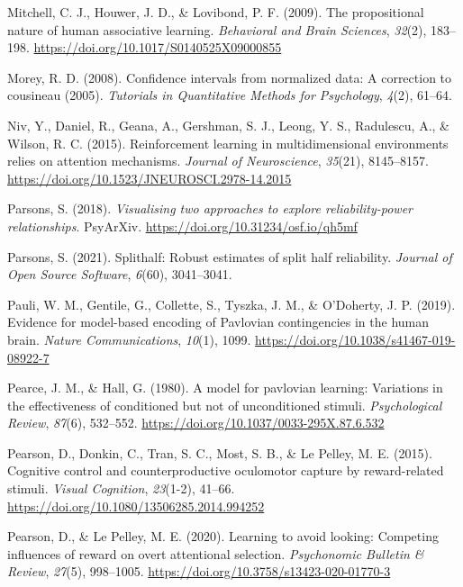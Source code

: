 \documentclass[
  man,
  floatsintext,
  longtable,
  nolmodern,
  notxfonts,
  notimes,
  mask,
  colorlinks=true,linkcolor=blue,citecolor=blue,urlcolor=blue]{apa7}
\newlength{\cslhangindent}
\newenvironment{CSLReferences}[2] %
 {\begin{list}{}{%
  \setlength{\itemindent}{0pt}
  \setlength{\leftmargin}{0pt}
  \setlength{\parsep}{0pt}
  \ifodd #1
   \setlength{\leftmargin}{\cslhangindent}
   \setlength{\itemindent}{-1\cslhangindent}
  \fi
  \setlength{\itemsep}{#2\baselineskip}}}
 {\end{list}}
\begin{document}
\begin{CSLReferences}{1}{0}
Mitchell, C. J., Houwer, J. D., \& Lovibond, P. F. (2009). The
propositional nature of human associative learning. \emph{Behavioral and
Brain Sciences}, \emph{32}(2), 183--198.
\url{https://doi.org/10.1017/S0140525X09000855}

Morey, R. D. (2008). Confidence intervals from normalized data: A
correction to cousineau (2005). \emph{Tutorials in Quantitative Methods
for Psychology}, \emph{4}(2), 61--64.

Niv, Y., Daniel, R., Geana, A., Gershman, S. J., Leong, Y. S.,
Radulescu, A., \& Wilson, R. C. (2015). Reinforcement learning in
multidimensional environments relies on attention mechanisms.
\emph{Journal of Neuroscience}, \emph{35}(21), 8145--8157.
\url{https://doi.org/10.1523/JNEUROSCI.2978-14.2015}

Parsons, S. (2018). \emph{Visualising two approaches to explore
reliability-power relationships}. PsyArXiv.
\url{https://doi.org/10.31234/osf.io/qh5mf}

Parsons, S. (2021). Splithalf: Robust estimates of split half
reliability. \emph{Journal of Open Source Software}, \emph{6}(60),
3041--3041.

Pauli, W. M., Gentile, G., Collette, S., Tyszka, J. M., \& O'Doherty, J.
P. (2019). Evidence for model-based encoding of Pavlovian contingencies
in the human brain. \emph{Nature Communications}, \emph{10}(1), 1099.
\url{https://doi.org/10.1038/s41467-019-08922-7}

Pearce, J. M., \& Hall, G. (1980). A model for pavlovian learning:
Variations in the effectiveness of conditioned but not of unconditioned
stimuli. \emph{Psychological Review}, \emph{87}(6), 532--552.
\url{https://doi.org/10.1037/0033-295X.87.6.532}

Pearson, D., Donkin, C., Tran, S. C., Most, S. B., \& Le Pelley, M. E.
(2015). Cognitive control and counterproductive oculomotor capture by
reward-related stimuli. \emph{Visual Cognition}, \emph{23}(1-2), 41--66.
\url{https://doi.org/10.1080/13506285.2014.994252}

Pearson, D., \& Le Pelley, M. E. (2020). Learning to avoid looking:
{Competing} influences of reward on overt attentional selection.
\emph{Psychonomic Bulletin \& Review}, \emph{27}(5), 998--1005.
\url{https://doi.org/10.3758/s13423-020-01770-3}


\end{CSLReferences}
\end{document}
